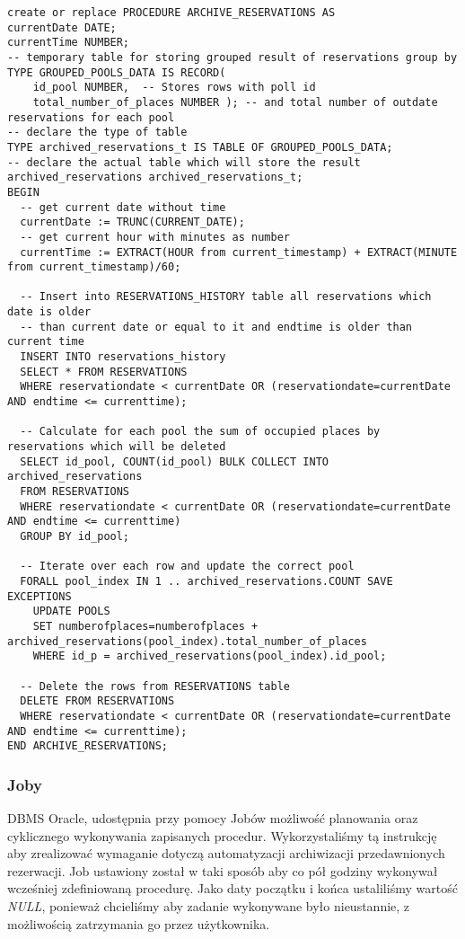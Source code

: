 \documentclass[a4paper]{article}
\begin{document}
\begin{verbatim}
create or replace PROCEDURE ARCHIVE_RESERVATIONS AS
currentDate DATE;
currentTime NUMBER;
-- temporary table for storing grouped result of reservations group by
TYPE GROUPED_POOLS_DATA IS RECORD(
    id_pool NUMBER,  -- Stores rows with poll id
    total_number_of_places NUMBER ); -- and total number of outdate reservations for each pool
-- declare the type of table
TYPE archived_reservations_t IS TABLE OF GROUPED_POOLS_DATA;
-- declare the actual table which will store the result
archived_reservations archived_reservations_t; 
BEGIN
  -- get current date without time
  currentDate := TRUNC(CURRENT_DATE);
  -- get current hour with minutes as number
  currentTime := EXTRACT(HOUR from current_timestamp) + EXTRACT(MINUTE from current_timestamp)/60; 
    
  -- Insert into RESERVATIONS_HISTORY table all reservations which date is older
  -- than current date or equal to it and endtime is older than current time
  INSERT INTO reservations_history
  SELECT * FROM RESERVATIONS
  WHERE reservationdate < currentDate OR (reservationdate=currentDate AND endtime <= currenttime);
  
  -- Calculate for each pool the sum of occupied places by reservations which will be deleted
  SELECT id_pool, COUNT(id_pool) BULK COLLECT INTO archived_reservations
  FROM RESERVATIONS
  WHERE reservationdate < currentDate OR (reservationdate=currentDate AND endtime <= currenttime)
  GROUP BY id_pool;
  
  -- Iterate over each row and update the correct pool
  FORALL pool_index IN 1 .. archived_reservations.COUNT SAVE EXCEPTIONS
    UPDATE POOLS
    SET numberofplaces=numberofplaces + archived_reservations(pool_index).total_number_of_places
    WHERE id_p = archived_reservations(pool_index).id_pool;
    
  -- Delete the rows from RESERVATIONS table
  DELETE FROM RESERVATIONS
  WHERE reservationdate < currentDate OR (reservationdate=currentDate AND endtime <= currenttime);
END ARCHIVE_RESERVATIONS;
\end{verbatim}


\subsubsection{Joby}

DBMS Oracle, udostępnia przy pomocy Jobów możliwość planowania oraz cyklicznego wykonywania zapisanych procedur. Wykorzystaliśmy tą instrukcję aby zrealizować wymaganie dotyczą automatyzacji archiwizacji przedawnionych rezerwacji. Job ustawiony został w taki sposób aby co pół godziny wykonywał wcześniej zdefiniowaną procedurę. Jako daty początku i końca ustaliliśmy wartość \textit{NULL}, ponieważ chcieliśmy aby zadanie wykonywane było nieustannie, z możliwością zatrzymania go przez użytkownika.
\end{document}

